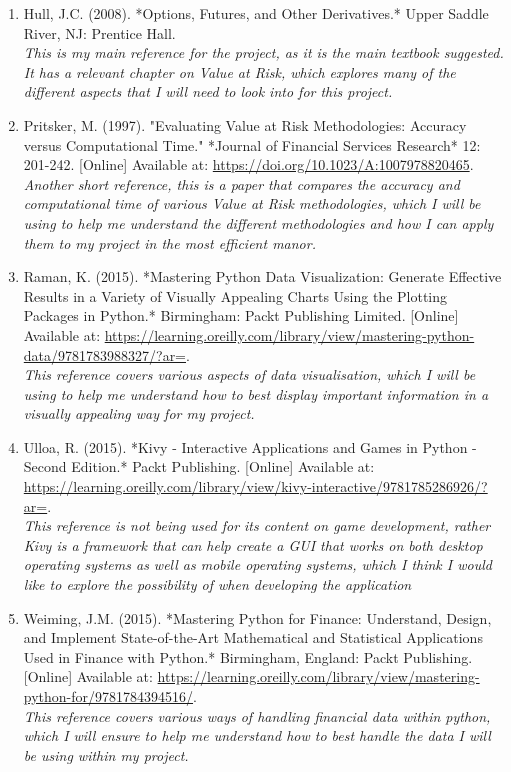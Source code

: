 \documentclass{article}
\begin{document}
\begin{enumerate}
  \item Hull, J.C. (2008). *Options, Futures, and Other Derivatives.* Upper Saddle River, NJ: Prentice Hall.
  \\\textit{This is my main reference for the project, as it is the main textbook suggested. It has a relevant chapter on Value at Risk, which explores many of the different aspects that I will need to look into for this project.}

  \item Pritsker, M. (1997). "Evaluating Value at Risk Methodologies: Accuracy versus Computational Time." *Journal of Financial Services Research* 12: 201-242. [Online] Available at: \url{https://doi.org/10.1023/A:1007978820465}.
  \\\textit{Another short reference, this is a paper that compares the accuracy and computational time of various Value at Risk methodologies, which I will be using to help me understand the different methodologies and how I can apply them to my project in the most efficient manor. }

  \item Raman, K. (2015). *Mastering Python Data Visualization: Generate Effective Results in a Variety of Visually Appealing Charts Using the Plotting Packages in Python.* Birmingham: Packt Publishing Limited. [Online] Available at: \url{https://learning.oreilly.com/library/view/mastering-python-data/9781783988327/?ar=}.
  \\\textit{This reference covers various aspects of data visualisation, which I will be using to help me understand how to best display important information in a visually appealing way for my project.}

  \item Ulloa, R. (2015). *Kivy - Interactive Applications and Games in Python - Second Edition.* Packt Publishing. [Online] Available at: \url{https://learning.oreilly.com/library/view/kivy-interactive/9781785286926/?ar=}.
  \\\textit{This reference is not being used for its content on game development, rather Kivy is a framework that can help create a GUI that works on both desktop operating systems as well as mobile operating systems, which I think I would like to explore the possibility of when developing the application}

  \item Weiming, J.M. (2015). *Mastering Python for Finance: Understand, Design, and Implement State-of-the-Art Mathematical and Statistical Applications Used in Finance with Python.* Birmingham, England: Packt Publishing. [Online] Available at: \url{https://learning.oreilly.com/library/view/mastering-python-for/9781784394516/}.
  \\\textit{This reference covers various ways of handling financial data within python, which I will ensure to help me understand how to best handle the data I will be using within my project.}
\end{enumerate}



\end{document}
